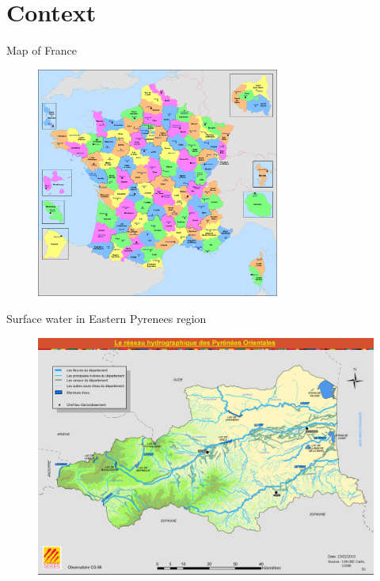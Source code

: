 \documentclass[newPxFont]{beamer}
\begin{document}

\section{Context}


\begin{frame}[c]{Map of France}
\vspace{-2em}
\begin{figure}
	\centering
	\includegraphics[width = 8cm]{img/map_france}
\end{figure}
\end{frame}


\begin{frame}[c]{Surface water in Eastern Pyrenees region}
\vspace{-4em}
\begin{figure}
	\hspace*{-0.6cm}
	\includegraphics[width = 1.1\textwidth]{img/canaux_po}
\end{figure}
\end{frame}
\end{document}
